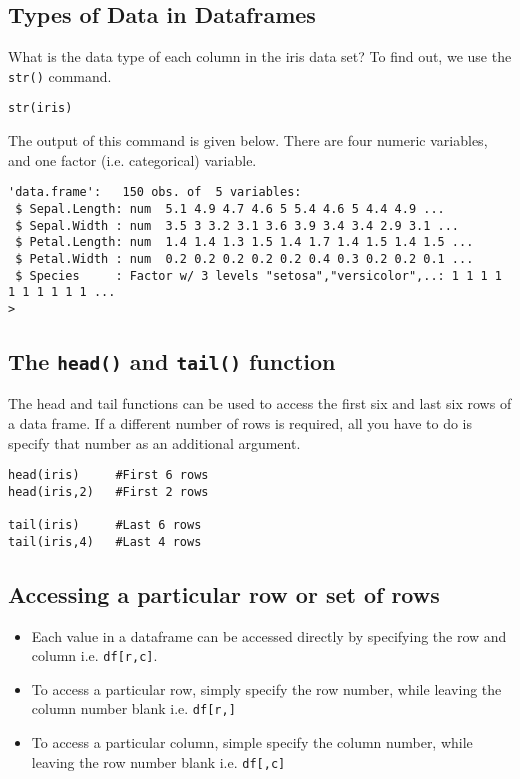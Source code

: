\documentclass[12pt]{article}
\begin{document}
\newpage
\subsection*{Types of Data in Dataframes}
What is the data type of each column in the iris data set? To find out, we use the \texttt{str()} command.

\begin{framed}
\begin{verbatim}
str(iris)
\end{verbatim}
\end{framed}
The output of this command is given below. There are four numeric variables, and one factor (i.e. categorical) variable.
\begin{verbatim}
'data.frame':   150 obs. of  5 variables:
 $ Sepal.Length: num  5.1 4.9 4.7 4.6 5 5.4 4.6 5 4.4 4.9 ...
 $ Sepal.Width : num  3.5 3 3.2 3.1 3.6 3.9 3.4 3.4 2.9 3.1 ...
 $ Petal.Length: num  1.4 1.4 1.3 1.5 1.4 1.7 1.4 1.5 1.4 1.5 ...
 $ Petal.Width : num  0.2 0.2 0.2 0.2 0.2 0.4 0.3 0.2 0.2 0.1 ...
 $ Species     : Factor w/ 3 levels "setosa","versicolor",..: 1 1 1 1 1 1 1 1 1 1 ...
> 
\end{verbatim}



\subsection*{The \texttt{head()} and \texttt{tail()} function}
The head and tail functions can be used to access the first six and last six rows of a data frame. If a different number of rows is required, all you have to do is specify that number as an additional argument.
\begin{framed}
\begin{verbatim}
head(iris)     #First 6 rows
head(iris,2)   #First 2 rows

tail(iris)     #Last 6 rows
tail(iris,4)   #Last 4 rows
\end{verbatim}
\end{framed}

\newpage

\subsection*{Accessing a particular row or set of rows}

\begin{itemize}
\item Each value in a dataframe can be accessed directly by specifying the row and column i.e. \texttt{df[r,c]}.
\item To access a particular row, simply specify the row number, while leaving the column number blank i.e. \texttt{df[r,]}
\item To access a particular column, simple specify the column number, while leaving the row number blank i.e. \texttt{df[,c]}
\end{itemize}
\end{document}
